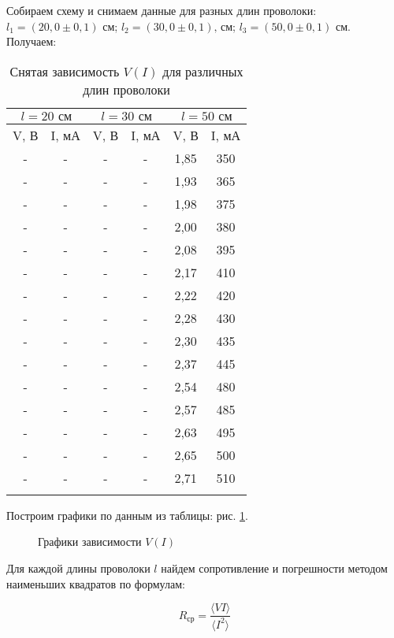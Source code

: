 	Собираем схему и снимаем данные для разных длин проволоки: $l_1=(20,0 \pm 0,1)\text{ см}$; $l_2=(30,0 \pm 0,1) \text{, см}$; $ l_3=(50,0 \pm 0,1)\text{ см}$. Получаем:
	\begin{longtable}[H]{|c|c||c|c||c|c|}
		\hline
		\multicolumn{2}{|c||}{$l = 20 \text{ см}$} & \multicolumn{2}{c||}{$l = 30 \text{ см}$} & \multicolumn{2}{c|}{$l = 50 \text{ см}$}  \\
		\hline
		 V, В & I, мА &  V, В & I, мА &  V, В & I, мА \\
		\hline
		 - & - &  - & - & 1,85 & 350 \\
		\hline
		  - & - &  - & - &  1,93 & 365 \\
		\hline
		 - & - &  - & - & 1,98 & 375 \\
		\hline
		 - & - &  - & - &  2,00 & 380 \\
		\hline
		  - & - &  - & - &  2,08 & 395 \\
		\hline
		 - & - &  - & - &  2,17 & 410 \\
		\hline
		 - & - &  - & - &  2,22 & 420 \\
		\hline
		  - & - &  - & - & 2,28 & 430 \\
		\hline
		  - & - &  - & - &  2,30 & 435 \\
		\hline
		  - & - &  - & - & 2,37 & 445 \\
		\hline
		  - & - &  - & - &  2,54 & 480 \\
		\hline
	 	- & - &  - & - &  2,57 & 485 \\
		\hline
		 - & - &  - & - & 2,63 & 495 \\
		\hline
		 - & - &  - & - &  2,65 & 500 \\
		\hline
		 - & - &  - & - &  2,71 & 510 \\
		\hline
		\caption{Снятая зависимость $V(I)$ для различных длин проволоки}
	\end{longtable}
	
	
	Построим графики по данным из таблицы: рис. \ref{graph}.
	\begin{figure}[h!]
		\caption{Графики зависимости $V(I)$}
		\label{graph}
	\end{figure}
	
	Для каждой длины проволоки $l$ найдем  сопротивление и погрешности методом наименьших квадратов по формулам:
	
	\begin{equation}
		R_\text{ср} = \frac{\langle VI\rangle}{\langle I^2 \rangle}
	\end{equation}
	
